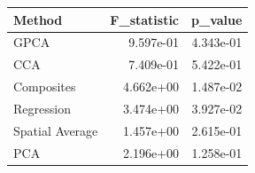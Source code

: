 \begin{tabular}{lrr}
\toprule
Method & F_statistic & p_value \\
\midrule
GPCA & 9.597e-01 & 4.343e-01 \\
CCA & 7.409e-01 & 5.422e-01 \\
Composites & 4.662e+00 & 1.487e-02 \\
Regression & 3.474e+00 & 3.927e-02 \\
Spatial Average & 1.457e+00 & 2.615e-01 \\
PCA & 2.196e+00 & 1.258e-01 \\
\bottomrule
\end{tabular}
